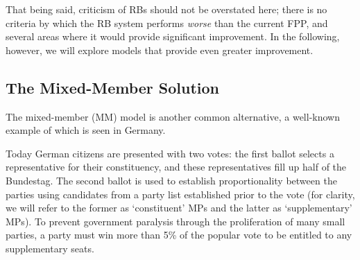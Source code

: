 That being said, criticism of RBs should not be overstated here; there is no criteria by which the RB system performs \emph{worse} than the current FPP, and several areas where it would provide significant improvement. 
In the following, however, we will explore models that provide even greater improvement.


\subsection{The Mixed-Member Solution}
\label{sec:german_model}

The mixed-member (MM) model is another common alternative, a well-known example of which is seen in Germany.

Today German citizens are presented with two votes: the first ballot selects a representative for their constituency, and these representatives fill up half of the Bundestag. 
The second ballot is used to establish proportionality between the parties using candidates from a party list established prior to the vote
(for clarity, we will refer to the former as `constituent' MPs  and the latter as `supplementary' MPs).
To prevent government paralysis through the proliferation of many small parties, a party must win more than 5\% of the popular vote to be entitled to any supplementary seats.

